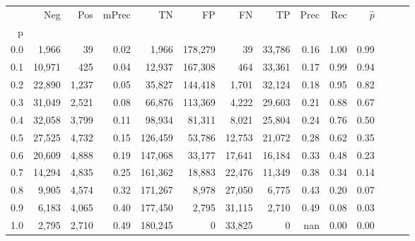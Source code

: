 \begin{tabular}{rrrrrrrrrrrrrr}
\toprule
{} &     Neg &    Pos & mPrec &       TN &       FP &      FN &      TP &  Prec &   Rec & $\hat{p}$ \\
p   &         &        &       &          &          &         &         &       &       &           \\
\midrule
0.0 &   1,966 &     39 &  0.02 &    1,966 &  178,279 &      39 &  33,786 &  0.16 &  1.00 &      0.99 \\
0.1 &  10,971 &    425 &  0.04 &   12,937 &  167,308 &     464 &  33,361 &  0.17 &  0.99 &      0.94 \\
0.2 &  22,890 &  1,237 &  0.05 &   35,827 &  144,418 &   1,701 &  32,124 &  0.18 &  0.95 &      0.82 \\
0.3 &  31,049 &  2,521 &  0.08 &   66,876 &  113,369 &   4,222 &  29,603 &  0.21 &  0.88 &      0.67 \\
0.4 &  32,058 &  3,799 &  0.11 &   98,934 &   81,311 &   8,021 &  25,804 &  0.24 &  0.76 &      0.50 \\
0.5 &  27,525 &  4,732 &  0.15 &  126,459 &   53,786 &  12,753 &  21,072 &  0.28 &  0.62 &      0.35 \\
0.6 &  20,609 &  4,888 &  0.19 &  147,068 &   33,177 &  17,641 &  16,184 &  0.33 &  0.48 &      0.23 \\
0.7 &  14,294 &  4,835 &  0.25 &  161,362 &   18,883 &  22,476 &  11,349 &  0.38 &  0.34 &      0.14 \\
0.8 &   9,905 &  4,574 &  0.32 &  171,267 &    8,978 &  27,050 &   6,775 &  0.43 &  0.20 &      0.07 \\
0.9 &   6,183 &  4,065 &  0.40 &  177,450 &    2,795 &  31,115 &   2,710 &  0.49 &  0.08 &      0.03 \\
1.0 &   2,795 &  2,710 &  0.49 &  180,245 &        0 &  33,825 &       0 &   nan &  0.00 &      0.00 \\
\bottomrule
\end{tabular}
